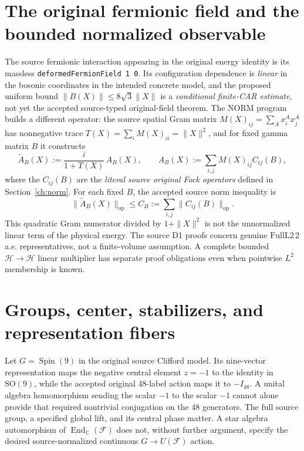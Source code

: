 \section{The original fermionic field and the bounded normalized observable}

The source fermionic interaction appearing in the original energy
identity is its massless \texttt{deformedFermionField 1 0}. Its
configuration dependence is \emph{linear} in the bosonic coordinates
in the intended concrete model, and the proposed uniform bound
$\|B(X)\|\le8\sqrt3\|X\|$ is a \emph{conditional finite-CAR
estimate}, not yet the accepted source-typed original-field theorem.
The NORM program builds a different operator: the source spatial Gram
matrix $M(X)_{ij}=\sum_A x_i^Ax_j^A$ has nonnegative trace
$T(X)=\sum_iM(X)_{ii}=\|X\|^2$, and for fixed gamma matrix $B$ it
constructs
\begin{equation}\label{eq:appendix-norm-observable}
 \widetilde A_B(X):=
 \frac{i}{1+T(X)}\,A_B(X),\qquad
 A_B(X):=\sum_{i,j}M(X)_{ij}C_{ij}(B),
\end{equation}
where the $C_{ij}(B)$ are the \emph{literal source original Fock
operators} defined in Section~\ref{ch:norm}. For each fixed $B$, the
accepted source norm inequality is
\begin{equation}\label{eq:appendix-norm-bound}
 \|\widetilde A_B(X)\|_{\mathrm{op}}
 \le C_B:=\sum_{i,j}\|C_{ij}(B)\|_{\mathrm{op}}.
\end{equation}
This quadratic Gram numerator divided by $1+\|X\|^2$ is not the
unnormalized linear term of the physical energy. The source D1
proofs concern genuine $\mathrm{FullL2}\,2$ a.e. representatives,
not a finite-volume assumption. A complete bounded
$\mathscr H\to\mathscr H$ linear multiplier has separate proof
obligations even when pointwise $L^2$ membership is known.

\section{Groups, center, stabilizers, and representation fibers}

Let $G=\operatorname{Spin}(9)$ in the original source Clifford model.
Its nine-vector representation maps the negative central element
$z=-1$ to the identity in $\mathrm{SO}(9)$, while the accepted
original 48-label action maps it to $-I_{48}$. A unital algebra
homomorphism sending the scalar $-1$ to the scalar $-1$ cannot alone
provide that required nontrivial conjugation on the 48 generators.
The full source group, a specified global lift, and its central
phase matter. A star algebra automorphism of
$\operatorname{End}_{\mathbb C}(\mathcal F)$ does not, without
further argument, specify the desired source-normalized continuous
$G\to U(\mathcal F)$ action.


